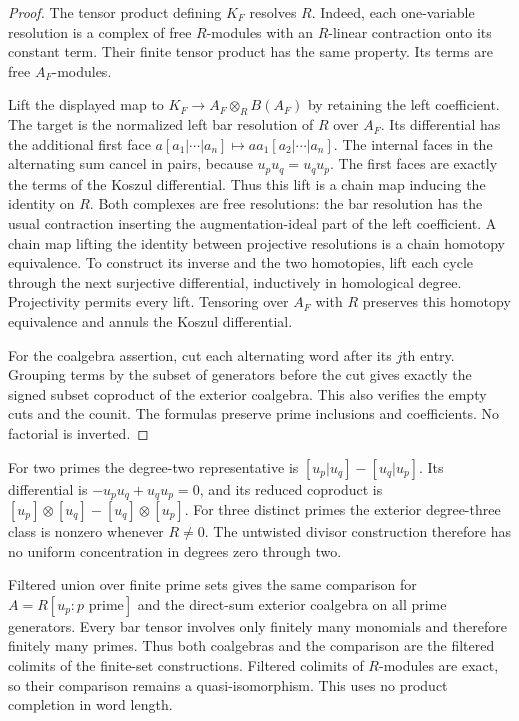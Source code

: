 \begin{proof}
The tensor product defining $K_F$ resolves $R$.  Indeed, each one-variable
resolution is a complex of free $R$-modules with an $R$-linear contraction
onto its constant term.  Their finite tensor product has the same property.
Its terms are free $A_F$-modules.

Lift the displayed map to $K_F\to A_F\otimes_R B(A_F)$ by retaining the
left coefficient.  The target is the normalized left bar resolution of
$R$ over $A_F$.  Its differential has the additional first face
$a[a_1|\cdots|a_n]\mapsto aa_1[a_2|\cdots|a_n]$.
The internal faces in the alternating sum cancel in pairs, because
$u_pu_q=u_qu_p$.  The first faces are exactly the terms of the Koszul
differential.  Thus this lift is a chain map inducing the identity on $R$.
Both complexes are free resolutions: the bar resolution has the usual
contraction inserting the augmentation-ideal part of the left coefficient.
A chain map lifting the identity between projective resolutions is a
chain homotopy equivalence.  To construct its inverse and the two
homotopies, lift each cycle through the next surjective differential,
inductively in homological degree.  Projectivity permits every lift.
Tensoring over $A_F$ with $R$ preserves this homotopy equivalence and
annuls the Koszul differential.

For the coalgebra assertion, cut each alternating word after its $j$th
entry.  Grouping terms by the subset of generators before the cut gives
exactly the signed subset coproduct of the exterior coalgebra.  This
also verifies the empty cuts and the counit.  The formulas preserve
prime inclusions and coefficients.  No factorial is inverted.
\end{proof}

For two primes the degree-two representative is
$[u_p|u_q]-[u_q|u_p]$.  Its differential is
$-u_pu_q+u_qu_p=0$, and its reduced coproduct is
$[u_p]\otimes[u_q]-[u_q]\otimes[u_p]$.
For three distinct primes the exterior degree-three class is nonzero
whenever $R\ne0$.  The untwisted divisor construction therefore has no
uniform concentration in degrees zero through two.

Filtered union over finite prime sets gives the same comparison for
$A=R[u_p:p\text{ prime}]$ and the direct-sum exterior coalgebra on all
prime generators.  Every bar tensor involves only finitely many monomials
and therefore finitely many primes.  Thus both coalgebras and the comparison
are the filtered colimits of the finite-set constructions.  Filtered
colimits of $R$-modules are exact, so their comparison remains a
quasi-isomorphism.  This uses no product completion in word length.

